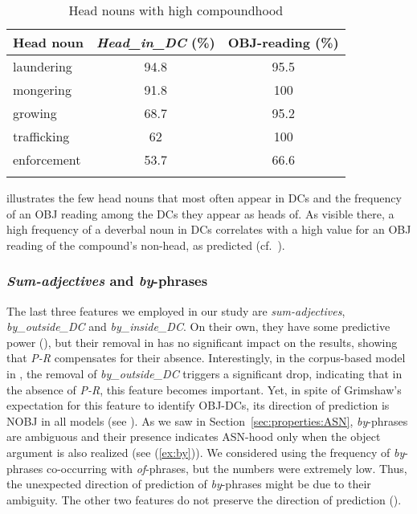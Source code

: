 \documentclass[output=paper]{langsci/langscibook}
\begin{document}
\begin{table}
\caption{\label{tab:compoundhood:ex}Head nouns with high compoundhood}
\begin{tabular}{lSS}
\lsptoprule
Head noun& {\textit{Head\_in\_DC} (\%)}& {OBJ-reading (\%)}\\
\midrule
laundering&94.8&95.5\\
mongering&91.8&100\\
growing&68.7 &95.2\\
trafficking&62&100\\
enforcement&53.7&66.6\\
\lspbottomrule
\end{tabular}
\end{table}

 illustrates the few head nouns that most often appear in DCs and the frequency of an OBJ reading among the DCs they appear as heads of. As visible there, a high frequency of a deverbal noun in DCs correlates with a high value for an OBJ reading of the compound's non-head, as predicted (cf.~). 

\subsubsection{\textit{Sum-adjectives} and \textit{by}-phrases}\label{sec:discussion-int-by}
The last three features we employed in our study are \textit{sum-adjectives},  \textit{by\_outside\_DC} and  \textit{by\_inside\_DC}. On their own, they have some predictive power (),  {but their removal in  has no significant impact on the results, showing that \textit{P-R} compensates for their absence. Interestingly, in the corpus-based model in  , the removal of \textit{by\_outside\_DC} triggers a significant drop, indicating that in the absence of \textit{P-R}, this feature becomes important. Yet, in spite of Grimshaw's expectation for this feature to identify OBJ-DCs, its direction of prediction is NOBJ in all models (see ). As we saw in Section~\ref{sec:properties:ASN}, \textit{by}-phrases are ambiguous and their presence indicates ASN-hood only when the object argument is also realized (see (\ref{ex:by})). We considered using the frequency of  \textit{by}-phrases co-occurring with \textit{of}-phrases, but the numbers were extremely low. Thus, the unexpected direction of prediction of \textit{by}-phrases might be due to their ambiguity. The other two features do not preserve the direction of prediction ().}
\end{document}
